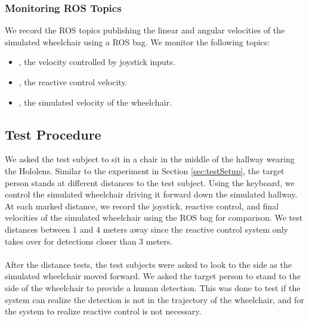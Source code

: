 \subsubsection{Monitoring ROS Topics}
We record the ROS topics publishing the linear and angular velocities of the simulated wheelchair using a ROS bag. We monitor the following topics:

\begin{itemize}
    \item {}, the velocity controlled by joystick inputs.
    \item {}, the reactive control velocity.
    \item {}, the simulated velocity of the wheelchair.
\end{itemize}

\subsection{Test Procedure}
We asked the test subject to sit in a chair in the middle of the hallway wearing the Hololens. Similar to the experiment in Section \ref{sec:testSetup}, the target person stands at different distances to the test subject. Using the keyboard, we control the simulated wheelchair driving it forward down the simulated hallway. At each marked distance, we record the joystick, reactive control, and final velocities of the simulated wheelchair using the ROS bag for comparison. We test distances between $1$ and $4$ meters away since the reactive control system only takes over for detections closer than $3$ meters. 

\paragraph{}After the distance tests, the test subjects were asked to look to the side as the simulated wheelchair moved forward. We asked the target person to stand to the side of the wheelchair to provide a human detection. This was done to test if the system can realize the detection is not in the trajectory of the wheelchair, and for the system to realize reactive control is not necessary.

